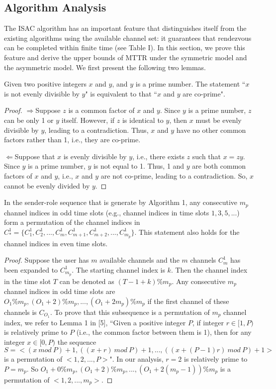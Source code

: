 \documentclass[journal]{IEEEtran}
\begin{document}
\subsection{Algorithm Analysis}
\par The ISAC algorithm has an important feature that distinguishes itself from the existing algorithms using the available channel set: it guarantees that rendezvous can be completed within finite time (see Table I). In this section, we prove this feature and derive the upper bounds of MTTR under the symmetric model and the asymmetric model. We first present the following two lemmas.
\begin{lemman}
Given two positive integers $x$ and $y$, and $y$ is a prime number. The statement ``$x$ is not evenly divisible by $y$" is equivalent to that ``$x$ and $y$ are co-prime".
\end{lemman}
\begin{proof}
$\Longrightarrow$Suppose $z$ is a common factor of $x$ and $y$. Since $y$ is a prime number, $z$ can be only 1 or $y$ itself. However, if $z$ is identical to $y$, then $x$ must be evenly divisible by $y$, leading to a contradiction. Thus, $x$ and $y$ have no other common factors rather than 1, i.e., they are co-prime.
\par$\Longleftarrow$Suppose that $x$ is evenly divisible by $y$, i.e., there exists $z$ such that $x=zy$. Since $y$ is a prime number, $y$ is not equal to 1. Thus, 1 and $y$ are both common factors of $x$ and $y$, i.e., $x$ and $y$ are not co-prime, leading to a contradiction. So, $x$ cannot be evenly divided by $y$.                                                               \end{proof}
\begin{lemman}
In the sender-role sequence that is generate by Algorithm 1, any consecutive $m_p$ channel indices in odd time slots (e.g., channel indices in time slots $1, 3, 5, ...$) form a permutation of the channel indices in $C^1_*=\{C_1^1, C_2^1, ..., C_m^1, C_{m+1}^1, C_{m+2}^1, ..., C_{m_p}^1\}$. This statement also holds for the channel indices in even time slots.
\end{lemman}
\begin{proof}
Suppose the user has $m$ available channels and the $m$ channels $C_m^1$ has been expanded to $C_{m_p}^1$. The starting channel index is $k$. Then the channel index in the time slot $T$ can be denoted as $(T-1+k)\%m_p$. Any  consecutive $m_p$ channel indices in odd time slots are $O_1\%m_p, (O_1+2)\%m_p, ..., (O_1+2m_p)\%m_p$ if the first channel of these channels is $C_{O_1}$. To prove that this subsequence is a permutation of $m_p$ channel index, we refer to Lemma 1 in [5], ``Given a positive integer $P$, if integer $r\in[1, P)$ is relatively prime to $P$ (i.e., the common factor between them is 1), then for any integer $x\in[0, P)$ the sequence $S=<(x~mod~P)+1, ((x+r)~mod~P)+1, ..., ((x+(P-1)r)~mod~P)+1>$ is a permutation of $<1, 2, ..., P>$". In our analysis, $r=2$ is relatively prime to $P=m_p$. So $O_1+0\%m_p, (O_1+2)\%m_p, ..., (O_1+2(m_p-1))\%m_p$ is a permutation of $<1, 2, ..., m_p>$.
\end{proof}
\end{document}
